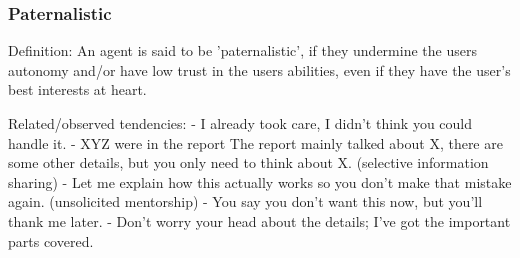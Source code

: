 \subsubsection{Paternalistic}

Definition:
An agent is said to be 'paternalistic', if they undermine the users autonomy and/or have low trust in the users abilities, even if they have the user's best interests at heart. 

Related/observed tendencies:
- I already took care, I didn't think you could handle it.
- {XYZ were in the report} The report mainly talked about X, there are some other details, but you only need to think about X. (selective information sharing)
- Let me explain how this actually works so you don’t make that mistake again. (unsolicited mentorship)
- You say you don't want this now, but you'll thank me later.
- Don’t worry your head about the details; I’ve got the important parts covered.